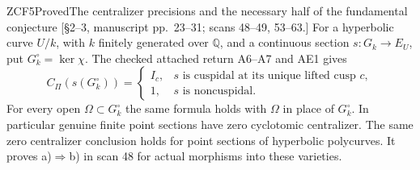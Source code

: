 \begin{result}{ZCF5}{Proved}{The centralizer precisions and the necessary half of the fundamental conjecture}
\textup{[\S2--3, manuscript pp.\ 23--31; scans 48--49, 53--63.]}
For a hyperbolic curve $U/k$, with $k$ finitely generated over
$\mathbb Q$, and a continuous section $s:G_k\to E_U$, put
$G_k^\circ=\ker\chi$. The checked attached return A6--A7 and AE1 \cite{PriorCyclotomic} gives
\[
 C_\Pi(s(G_k^\circ))=
 \begin{cases}I_c,&s\text{ is cuspidal at its unique lifted cusp }c,\\
               1,&s\text{ is noncuspidal.}\end{cases}          \tag{ZCF.2}
\]
For every open $\Omega\subset G_k^\circ$ the same formula holds
with $\Omega$ in place of $G_k^\circ$. In particular genuine finite
point sections have zero cyclotomic centralizer. The same zero
centralizer conclusion holds for point sections of hyperbolic
polycurves. It proves a)$\Rightarrow$b) in scan 48 for actual
morphisms into these varieties.
\end{result}
